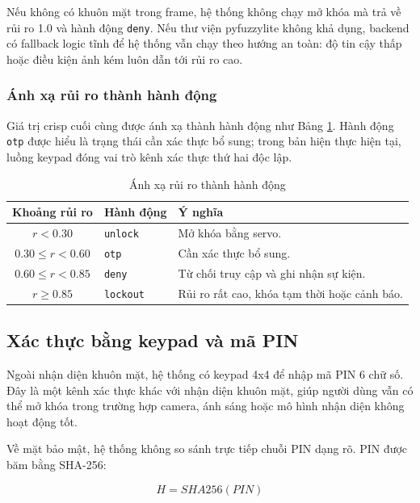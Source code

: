 Nếu không có khuôn mặt trong frame, hệ thống không chạy mở khóa mà trả về rủi ro 1.0 và hành động \texttt{deny}. Nếu thư viện pyfuzzylite không khả dụng, backend có fallback logic tĩnh để hệ thống vẫn chạy theo hướng an toàn: độ tin cậy thấp hoặc điều kiện ảnh kém luôn dẫn tới rủi ro cao.

\subsubsection{Ánh xạ rủi ro thành hành động}

Giá trị crisp cuối cùng được ánh xạ thành hành động như Bảng \ref{tab:risk_action_map}. Hành động \texttt{otp} được hiểu là trạng thái cần xác thực bổ sung; trong bản hiện thực hiện tại, luồng keypad đóng vai trò kênh xác thực thứ hai độc lập.

\begin{table}[H]
\centering
\caption{Ánh xạ rủi ro thành hành động}
\label{tab:risk_action_map}
\begin{tabular}{|c|l|l|}
\hline
\textbf{Khoảng rủi ro} & \textbf{Hành động} & \textbf{Ý nghĩa} \\
\hline
$r < 0.30$ & \texttt{unlock} & Mở khóa bằng servo. \\
\hline
$0.30 \le r < 0.60$ & \texttt{otp} & Cần xác thực bổ sung. \\
\hline
$0.60 \le r < 0.85$ & \texttt{deny} & Từ chối truy cập và ghi nhận sự kiện. \\
\hline
$r \ge 0.85$ & \texttt{lockout} & Rủi ro rất cao, khóa tạm thời hoặc cảnh báo. \\
\hline
\end{tabular}
\end{table}

\subsection{Xác thực bằng keypad và mã PIN}

Ngoài nhận diện khuôn mặt, hệ thống có keypad 4x4 để nhập mã PIN 6 chữ số. Đây là một kênh xác thực khác với nhận diện khuôn mặt, giúp người dùng vẫn có thể mở khóa trong trường hợp camera, ánh sáng hoặc mô hình nhận diện không hoạt động tốt.

Về mặt bảo mật, hệ thống không so sánh trực tiếp chuỗi PIN dạng rõ. PIN được băm bằng SHA-256:

\begin{equation}
    H = SHA256(PIN)
\end{equation}

